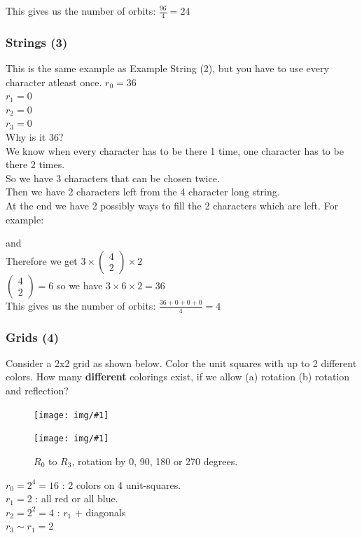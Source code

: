 \documentclass[12pt,onecolumn%
]{scrartcl}
\newcommand{\img}[3]{
\begin{figure}[H]
	\centering
	\texttt{[image: img/\#1]}
	\captionsetup{width=0.8\textwidth, justification=centering}
	\caption{#3}
\end{figure}
}
\newcommand{\imgnc}[2]{
\begin{figure}[H]
	\centering
	\texttt{[image: img/\#1]}
	\captionsetup{width=0.8\textwidth, justification=centering}
\end{figure}
}
\newcommand{\st}[4]{
\boxed{\text{#1}}\boxed{\text{#2}}\boxed{\text{#3}}\boxed{\text{#4}}
}
\begin{document}
{This gives us the number of orbits: $\frac{96}{4} = 24$

\subsubsection{Strings (3)}
This is the same example as Example String (2), but you have to use every character atleast once.
$r_{0} = 36$\\
$r_{1} = 0$\\
$r_{2} = 0$\\
$r_{3} = 0$\\

Why is it 36?\\
We know when every character has to be there 1 time, one character has to be there 2 times.\\
So we have 3 characters that can be chosen twice.\\
Then we have 2 characters left from the 4 character long string. \\
At the end we have 2 possibly ways to fill the 2 characters which are left. For example:
\st{B}{A}{C}{A} and \st{C}{A}{B}{A} \\

Therefore we get $3 \times\begin{pmatrix}4\\2\end{pmatrix}\times 2$ \\
$\begin{pmatrix}4\\2\end{pmatrix} = 6$ so we have $3 \times 6 \times 2 = 36$\\

This gives us the number of orbits: $\frac{36+0+0+0}{4} = 4$

\subsubsection{Grids (4)}

Consider a 2x2 grid as shown below. Color the unit squares with up to 2 different colors. How many {\bf different} colorings exist, if we allow (a) rotation (b) rotation and reflection?

\imgnc{block_2x2}{trim=140 610 400 120, clip}

\img{block_2x2_rot}{scale=1.1,trim=140 350 335 125, clip}{$R_0$ to $R_3$, rotation by 0, 90, 180 or 270 degrees.}

$r_0 = 2^4 = 16$ : 2 colors on 4 unit-squares. \\
$r_1 = 2$ : all red or all blue. \\
$r_2 = 2^2 = 4$ : $r_1$ + diagonals \\
$r_3 \sim r_1 = 2$

}
\end{document}
